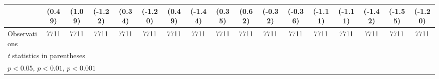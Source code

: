 \begin{table}[htbp]
\begin{tabular}{l*{16}{c}}
                    &      (0.49)         &      (1.09)         &     (-1.22)         &      (0.34)         &     (-1.20)         &      (0.49)         &     (-1.44)         &      (0.35)         &      (0.62)         &     (-0.32)         &     (-0.36)         &     (-1.11)         &     (-1.11)         &     (-1.42)         &     (-1.55)         &     (-1.20)         \\
\midrule
Observations        &        7711         &        7711         &        7711         &        7711         &        7711         &        7711         &        7711         &        7711         &        7711         &        7711         &        7711         &        7711         &        7711         &        7711         &        7711         &        7711         \\
\bottomrule
\multicolumn{17}{l}{\footnotesize \textit{t} statistics in parentheses}\\
\multicolumn{17}{l}{\footnotesize \sym{*} \(p<0.05\), \sym{**} \(p<0.01\), \sym{***} \(p<0.001\)}\\
\end{tabular}
\end{table}
